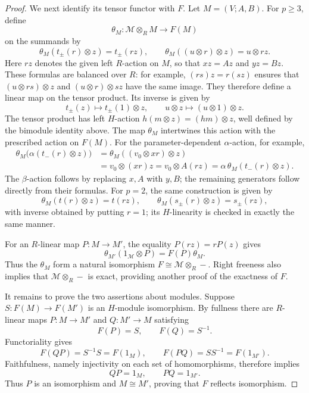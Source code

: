 \documentclass[10pt,oneside]{amsart}
\theoremstyle{definition}
\begin{document}
\begin{proof}
We next identify its tensor functor with $F$. Let $M=(V;A,B)$.
For $p\ge3$, define
\[
 \theta_M:\mathcal M\otimes_R M\longrightarrow F(M)
\]
on the summands by
\[
 \theta_M(t_\pm(r)\otimes z)=t_\pm(rz),\qquad
 \theta_M((u\otimes r)\otimes z)=u\otimes rz.
\]
Here $rz$ denotes the given left $R$-action on $M$, so that
$xz=Az$ and $yz=Bz$. These formulas are balanced over $R$:
for example, $(rs)z=r(sz)$ ensures that
$(u\otimes rs)\otimes z$ and $(u\otimes r)\otimes sz$
have the same image. They therefore define a linear map on the
tensor product. Its inverse is given by
\[
 t_\pm(z)\longmapsto t_\pm(1)\otimes z,\qquad
 u\otimes z\longmapsto(u\otimes1)\otimes z.
\]
The tensor product has left $H$-action
$h(m\otimes z)=(hm)\otimes z$, well defined by the bimodule
identity above. The map $\theta_M$ intertwines this action with
the prescribed action on $F(M)$. For the parameter-dependent
$\alpha$-action, for example,
\begin{align*}
 \theta_M\bigl(\alpha(t_-(r)\otimes z)\bigr)
 &=\theta_M((v_0\otimes xr)\otimes z)\\
 &=v_0\otimes(xr)z
 =v_0\otimes A(rz)
 =\alpha\,\theta_M(t_-(r)\otimes z).
\end{align*}
The $\beta$-action follows by replacing $x,A$ with $y,B$;
the remaining generators follow directly from their formulas.
For $p=2$, the same construction is given by
\[
 \theta_M(t(r)\otimes z)=t(rz),\qquad
 \theta_M(s_\pm(r)\otimes z)=s_\pm(rz),
\]
with inverse obtained by putting $r=1$; its $H$-linearity is checked
in exactly the same manner.

For an $R$-linear map $P:M\to M'$, the equality $P(rz)=rP(z)$
gives
\[
 \theta_{M'}(1_{\mathcal M}\otimes P)=F(P)\theta_M.
\]
Thus the $\theta_M$ form a natural isomorphism
$F\cong\mathcal M\otimes_R-$. Right freeness also implies that
$\mathcal M\otimes_R-$ is exact, providing another proof of the
exactness of $F$.

It remains to prove the two assertions about modules. Suppose
$S:F(M)\to F(M')$ is an $H$-module isomorphism. By fullness there
are $R$-linear maps $P:M\to M'$ and $Q:M'\to M$ satisfying
\[
 F(P)=S,\qquad F(Q)=S^{-1}.
\]
Functoriality gives
\[
 F(QP)=S^{-1}S=F(1_M),\qquad
 F(PQ)=SS^{-1}=F(1_{M'}).
\]
Faithfulness, namely injectivity on each set of homomorphisms,
therefore implies
\[
 QP=1_M,\qquad PQ=1_{M'}.
\]
Thus $P$ is an isomorphism and $M\cong M'$, proving that $F$
reflects isomorphism.


\end{proof}
\end{document}
